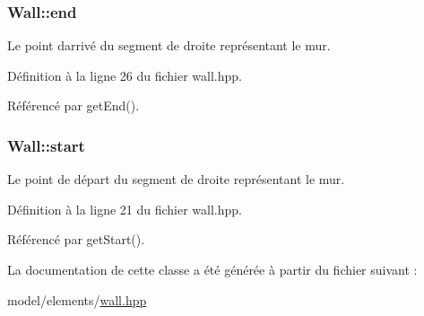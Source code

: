 \subsubsection[{end}]{ Wall\+::end\hspace{0.3cm}{\ttfamily [private]}}\label{classWall_a26e8075259c6cd51630b546f3e37d2a1}


Le point d\textquotesingle{}arrivé du segment de droite représentant le mur. 



Définition à la ligne 26 du fichier wall.\+hpp.



Référencé par get\+End().

\hypertarget{classWall_a05a052498fc50c585a8e8be95dc5af01}{}
\subsubsection[{start}]{ Wall\+::start\hspace{0.3cm}{\ttfamily [private]}}\label{classWall_a05a052498fc50c585a8e8be95dc5af01}


Le point de départ du segment de droite représentant le mur. 



Définition à la ligne 21 du fichier wall.\+hpp.



Référencé par get\+Start().



La documentation de cette classe a été générée à partir du fichier suivant \+:\begin{DoxyCompactItemize}
\item 
model/elements/\hyperlink{wall_8hpp}{wall.\+hpp}\end{DoxyCompactItemize}
